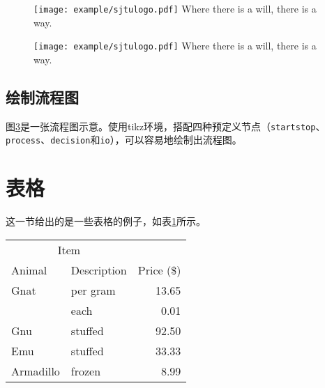 \begin{figure}[!htp]
 \centering
 \texttt{[image: example/sjtulogo.pdf]}
  {Where there is a will, there is a way.}
 \label{fig:longcaptionbad}
\end{figure}

\begin{figure}[!htbp]
  \centering
  \begin{minipage}[b]{0.6\textwidth}
    \centering
    \texttt{[image: example/sjtulogo.pdf]}
     {Where there is a will, there is a way.}
    \label{fig:longcaptiongood}
  \end{minipage}     
\end{figure}

\subsection{绘制流程图}

图\ref{fig:flow_chart}是一张流程图示意。使用tikz环境，搭配四种预定义节点（\verb+startstop+、\verb+process+、\verb+decision+和\verb+io+），可以容易地绘制出流程图。
\begin{figure}[!htp]
    \centering
    \resizebox{6cm}{!}{}
    \label{fig:flow_chart}
\end{figure}
  
\clearpage

\section{表格}
\label{sec:tab}

这一节给出的是一些表格的例子，如表\ref{tab:firstone}所示。

\begin{table}[!hpb]
  \centering
  \label{tab:firstone}
  \begin{tabular}{@{}llr@{}} \toprule
    \multicolumn{2}{c}{Item} \\ \cmidrule(r){1-2}
    Animal & Description & Price (\$)\\ \midrule
    Gnat & per gram & 13.65 \\
    & each & 0.01 \\
    Gnu & stuffed & 92.50 \\
    Emu & stuffed & 33.33 \\
    Armadillo & frozen & 8.99 \\ \bottomrule
  \end{tabular}
\end{table}

